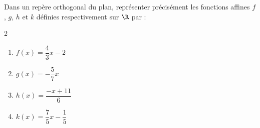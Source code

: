\begin{exo}{}
	Dans un repère orthogonal du plan, représenter précisément les fonctions affines $f$, $g$, $h$ et $k$ définies respectivement sur $\R$ par :
	\vspace*{-2mm}
	\begin{multicols}{2}
	\begin{enumerate}[itemsep=2mm]
		\item $f(x) = \dfrac{4}{3}x - 2$
		\item $g(x) = -\dfrac{5}{7}x$
		\item $h(x) = \dfrac{-x + 11}{6}$
		\item $k(x) = \dfrac{7}{5}x - \dfrac{1}{5}$
	\end{enumerate}
	\end{multicols}\vspace*{-2mm}
\end{exo}
